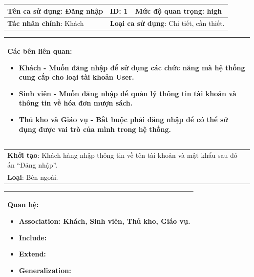 \documentclass[12pt]{report}
\begin{document}
\begin{center}

\newpage
\begin{tabular}{| m{6cm} | m{3cm} | m{6cm} |}
    \hline
    \textbf{Tên ca sử dụng}: Đăng nhập & \textbf{ID}: 1 & \textbf{Mức độ quan trọng}: high \\
    \hline
    \textbf{Tác nhân chính}: Khách & \multicolumn{2}{|l|}{\textbf{Loại ca sử dụng}: Chi tiết, cần thiết.} \\
    \hline
\end{tabular}
\begin{tabular}{| m{15.9cm} |}
    \hline
        \textbf{Các bên liên quan:} 
        \begin{itemize}
            \item Khách - Muốn đăng nhập để sử dụng các chức năng mà hệ thống cung cấp cho loại tài khoản User. 
            \item Sinh viên - Muốn đăng nhập để quản lý thông tin tài khoản và thông tin về hóa đơn mượn sách. 
            \item Thủ kho và Giáo vụ - Bắt buộc phải đăng nhập để có thể sử dụng được vai trò của mình trong hệ thống. 
        \end{itemize} \\
    \hline
\end{tabular}

\begin{tabular}{| m{15.9cm} |}
    \hline
    \textbf{Khởi tạo}: Khách hàng nhập thông tin về tên tài khoản và mật khẩu sau đó ấn ``Đăng nhập''. \\
    \textbf{Loại}: Bên ngoài.  \\
    \hline
\end{tabular}

\begin{tabular}{| m{15.9cm} |}
    \hline
    \textbf{Quan hệ}:
    \begin{itemize}
        \item Association: Khách, Sinh viên, Thủ kho, Giáo vụ. 
        \item Include: 
        \item Extend: 
        \item Generalization: 
    \end{itemize} \\
    \hline
\end{tabular}


\end{center}
\end{document}
